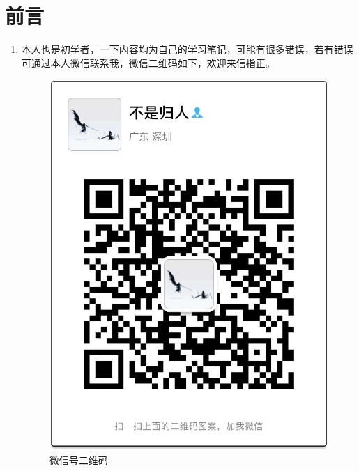 \section{前言}
\begin{enumerate}
	\item 本人也是初学者，一下内容均为自己的学习笔记，可能有很多错误，若有错误可通过本人微信联系我，微信二维码如下，欢迎来信指正。
	\begin{figure}[htbp]
		\centering
		\includegraphics[scale=0.25]{images/微信号二维码}
		\caption{微信号二维码}
	\end{figure}
\end{enumerate}




























